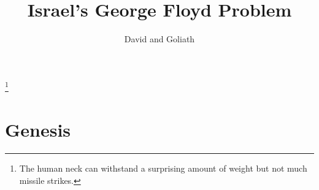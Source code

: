 \documentclass{article}
\title{Israel's George Floyd Problem}
\author{David\emoji{man-dark-skin-tone} and Goliath\emoji{flag-israel}}
\begin{document}
\maketitle

\noindent{}\footnote{The human neck can withstand a surprising amount of weight but not much missile strikes.}

\hfill \break

\section{Genesis}
\end{document}
